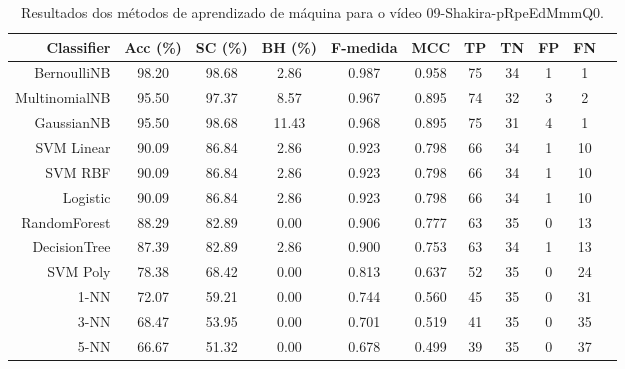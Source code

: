 \begin{table}[!htb]
\centering
\caption{Resultados dos métodos de aprendizado de máquina para o vídeo 09-Shakira-pRpeEdMmmQ0.}
\label{tab:09-Shakira-pRpeEdMmmQ0}
\begin{tabular}{r|c|c|c|c|c|c|c|c|c|c}
\hline\hline
Classifier & Acc (\%) & SC (\%) & BH (\%) & F-medida & MCC & TP & TN & FP & FN \\ \hline
BernoulliNB & 98.20 & 98.68 & 2.86 & 0.987 & 0.958 & 75 & 34 & 1 & 1 \\ 
MultinomialNB & 95.50 & 97.37 & 8.57 & 0.967 & 0.895 & 74 & 32 & 3 & 2 \\ 
GaussianNB & 95.50 & 98.68 & 11.43 & 0.968 & 0.895 & 75 & 31 & 4 & 1 \\ 
SVM Linear & 90.09 & 86.84 & 2.86 & 0.923 & 0.798 & 66 & 34 & 1 & 10 \\ 
SVM RBF & 90.09 & 86.84 & 2.86 & 0.923 & 0.798 & 66 & 34 & 1 & 10 \\ 
Logistic & 90.09 & 86.84 & 2.86 & 0.923 & 0.798 & 66 & 34 & 1 & 10 \\ 
RandomForest & 88.29 & 82.89 & 0.00 & 0.906 & 0.777 & 63 & 35 & 0 & 13 \\ 
DecisionTree & 87.39 & 82.89 & 2.86 & 0.900 & 0.753 & 63 & 34 & 1 & 13 \\ 
SVM Poly & 78.38 & 68.42 & 0.00 & 0.813 & 0.637 & 52 & 35 & 0 & 24 \\ 
1-NN & 72.07 & 59.21 & 0.00 & 0.744 & 0.560 & 45 & 35 & 0 & 31 \\ 
3-NN & 68.47 & 53.95 & 0.00 & 0.701 & 0.519 & 41 & 35 & 0 & 35 \\ 
5-NN & 66.67 & 51.32 & 0.00 & 0.678 & 0.499 & 39 & 35 & 0 & 37 \\ 
\hline\hline
\end{tabular}
\end{table}
